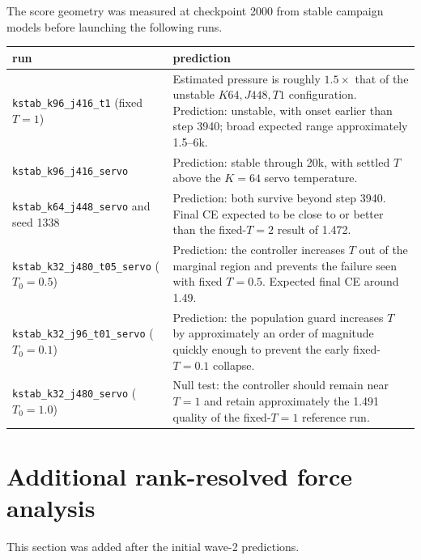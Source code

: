 \documentclass[11pt,a4paper]{article}
\newcommand{\code}[1]{\texttt{#1}}
\begin{document}
The score geometry was measured at checkpoint 2000 from stable campaign models
before launching the following runs.

\begin{center}\small
\begin{tabular}{p{4.6cm}p{9.2cm}}
\toprule
run & prediction \\
\midrule

\code{kstab\_k96\_j416\_t1}
(fixed \(T=1\))
&
Estimated pressure is roughly \(1.5\times\) that of the unstable
\(K64,J448,T1\) configuration.
Prediction: unstable, with onset earlier than step 3940; broad expected range
approximately 1.5--6k.
\\

\code{kstab\_k96\_j416\_servo}
&
Prediction: stable through 20k, with settled \(T\) above the \(K=64\) servo
temperature.
\\

\code{kstab\_k64\_j448\_servo}
and seed 1338
&
Prediction: both survive beyond step 3940.
Final CE expected to be close to or better than the fixed-\(T=2\) result
of 1.472.
\\

\code{kstab\_k32\_j480\_t05\_servo}
(\(T_0=0.5\))
&
Prediction: the controller increases \(T\) out of the marginal region and
prevents the failure seen with fixed \(T=0.5\).
Expected final CE around 1.49.
\\

\code{kstab\_k32\_j96\_t01\_servo}
(\(T_0=0.1\))
&
Prediction: the population guard increases \(T\) by approximately an order of
magnitude quickly enough to prevent the early fixed-\(T=0.1\) collapse.
\\

\code{kstab\_k32\_j480\_servo}
(\(T_0=1.0\))
&
Null test: the controller should remain near \(T=1\) and retain approximately
the 1.491 quality of the fixed-\(T=1\) reference run.
\\

\bottomrule
\end{tabular}
\end{center}


\section{Additional rank-resolved force analysis}

This section was added after the initial wave-2 predictions.
\end{document}
